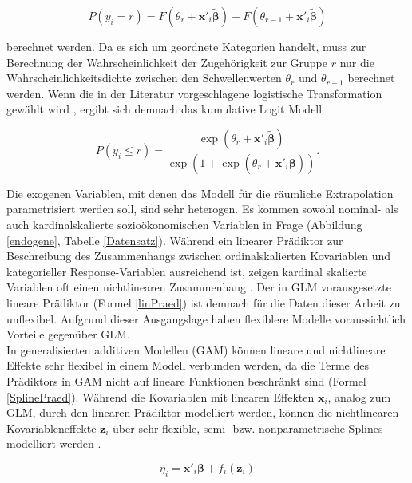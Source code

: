 \documentclass{Vorlage}
\begin{document}
\begin{equation}
P(y_i=r)=F(\theta_r+\mathbf{x}'_i \boldsymbol{\tilde{\beta}})-F(\theta_{r-1}+\mathbf{x}'_i \boldsymbol{\tilde{\beta}})
\end{equation}

berechnet werden. Da es sich um geordnete Kategorien handelt, muss zur Berechnung der Wahrscheinlichkeit der Zugehörigkeit zur Gruppe $r$ nur die Wahrscheinlichkeitsdichte zwischen den Schwellenwerten $\theta_{r}$ und $\theta_{r-1}$ berechnet werden. Wenn die in der Literatur vorgeschlagene logistische Transformation gewählt wird \cite[p. 335]{fahrmeir2013regression}, ergibt sich demnach das kumulative Logit Modell

\begin{equation}
P(y_i\leq r)=\frac{\exp(\theta_r+\mathbf{x}'_i \boldsymbol{\tilde{\beta}})}{\exp(1+\exp(\theta_r+\mathbf{x}'_i \boldsymbol{\tilde{\beta}}))}.
\end{equation}

Die exogenen Variablen, mit denen das Modell für die räumliche Extrapolation parametrisiert werden soll, sind sehr heterogen. Es kommen sowohl nominal- als auch kardinalskalierte sozioökonomischen Variablen in Frage (Abbildung \ref{endogene}, Tabelle \ref{Datensatz}). Während ein linearer Prädiktor zur Beschreibung des Zusammenhangs zwischen ordinalskalierten Kovariablen und kategorieller Response-Variablen ausreichend ist, zeigen kardinal skalierte Variablen oft einen nichtlinearen Zusammenhang \cite[p. 9]{fahrmeir2009regression}. Der in GLM vorausgesetzte lineare Prädiktor (Formel \ref{linPraed}) ist demnach für die Daten dieser Arbeit zu unflexibel. Aufgrund dieser Ausgangslage haben flexiblere Modelle voraussichtlich Vorteile gegenüber GLM.\\
In generalisierten additiven Modellen (GAM) können lineare und nichtlineare Effekte sehr flexibel in einem Modell verbunden werden, da die Terme des Prädiktors in GAM nicht auf lineare Funktionen beschränkt sind (Formel \ref{SplinePraed}). Während die Kovariablen mit linearen Effekten $\mathbf{x}_i$, analog zum GLM, durch den linearen Prädiktor modelliert werden, können die nichtlinearen Kovariableneffekte $\mathbf{z}_i$ über sehr flexible, semi- bzw. nonparametrische Splines modelliert werden \cite[p. 1 f.]{wood2016}.

\begin{equation} \label{SplinePraed}
\eta_{i} =\mathbf{x}'_i \boldsymbol{\beta}+f_{i}(\mathbf{z}_{i})
\end{equation}
\end{document}
